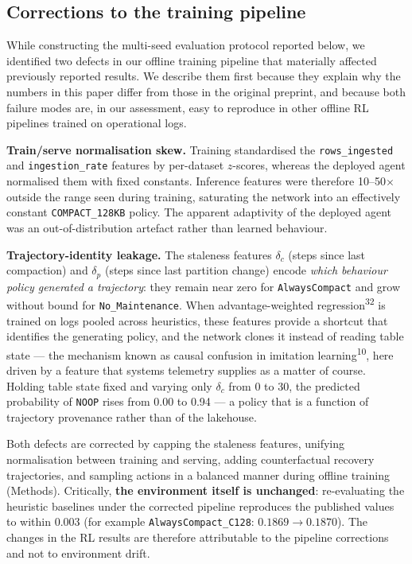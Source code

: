 \documentclass[fleqn,10pt]{wlscirep}
\newcommand{\noop}{\texttt{NOOP}}
\newcommand{\conehundredtwentyeight}{\texttt{COMPACT\_128KB}}
\begin{document}
\subsection*{Corrections to the training pipeline}
\label{sec:corrections}

While constructing the multi-seed evaluation protocol reported below, we
identified two defects in our offline training pipeline that materially
affected previously reported results. We describe them first because
they explain why the numbers in this paper differ from those in the
original preprint, and because both failure modes are, in our
assessment, easy to reproduce in other offline RL pipelines trained on
operational logs.

\textbf{Train/serve normalisation skew.}
Training standardised the \texttt{rows\_ingested} and
\texttt{ingestion\_rate} features by per-dataset $z$-scores, whereas the
deployed agent normalised them with fixed constants. Inference features
were therefore 10--50$\times$ outside the range seen during training,
saturating the network into an effectively constant
\conehundredtwentyeight{} policy. The apparent adaptivity of the
deployed agent was an out-of-distribution artefact rather than learned
behaviour.

\textbf{Trajectory-identity leakage.}
The staleness features $\delta_c$ (steps since last compaction) and
$\delta_p$ (steps since last partition change) encode \emph{which
behaviour policy generated a trajectory}: they remain near zero for
\texttt{AlwaysCompact} and grow without bound for
\texttt{No\_Maintenance}. When advantage-weighted
regression\textsuperscript{32} is trained on logs pooled across
heuristics, these features provide a shortcut that
identifies the generating policy, and the network clones it instead of
reading table state --- the mechanism known as causal confusion in
imitation learning\textsuperscript{10}, here driven by a feature
that systems telemetry supplies as a matter of course. Holding table state fixed and varying only
$\delta_c$ from 0 to 30, the predicted probability of \noop{} rises from
0.00 to 0.94 --- a policy that is a function of trajectory provenance
rather than of the lakehouse.

Both defects are corrected by capping the staleness features, unifying
normalisation between training and serving, adding counterfactual
recovery trajectories, and sampling actions in a balanced manner during
offline training (Methods). Critically, \textbf{the environment itself
is unchanged}: re-evaluating the heuristic baselines under the corrected
pipeline reproduces the published values to within 0.003 (for example
\texttt{AlwaysCompact\_C128}: $0.1869 \rightarrow 0.1870$). The changes
in the RL results are therefore attributable to the pipeline
corrections and not to environment drift.
\end{document}
